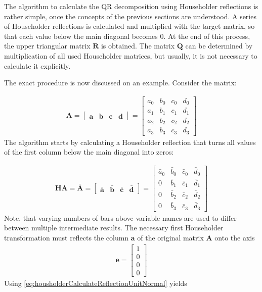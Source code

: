 The algorithm to calculate the QR decomposition using Householder reflections is rather simple, once the concepts of the previous sections are understood.
A series of Householder reflections is calculated and multiplied with the target matrix, so that each value below the main diagonal becomes 0.
At the end of this process, the upper triangular matrix $\mathbf{R}$ is obtained.
The matrix $\mathbf{Q}$ can be determined by multiplication of all used Householder matrices, but usually, it is not necessary to calculate it explicitly.

The exact procedure is now discussed on an example.
Consider the matrix:

\begin{align*}
\mathbf{A}
=
\begin{bmatrix}
\mathbf{a} & \mathbf{b} & \mathbf{c} & \mathbf{d}
\end{bmatrix}
=
\begin{bmatrix}
a_0&b_0&c_0&d_0\\
a_1&b_1&c_1&d_1\\
a_2&b_2&c_2&d_2\\
a_3&b_3&c_3&d_3
\end{bmatrix}
\end{align*}
%
The algorithm starts by calculating a Householder reflection that turns all values of the first column below the main diagonal into zeros:

\begin{align}
\mathbf{H}\mathbf{A} 
=
\mathbf{\bar{A}}
=
\begin{bmatrix}
\mathbf{\bar{a}} & \mathbf{\bar{b}} & \mathbf{\bar{c}} & \mathbf{\bar{d}}
\end{bmatrix}
=
\begin{bmatrix}
\bar{a}_0&\bar{b}_0&\bar{c}_0&\bar{d}_0\\
0        &\bar{b}_1&\bar{c}_1&\bar{d}_1\\
0        &\bar{b}_2&\bar{c}_2&\bar{d}_2\\
0        &\bar{b}_3&\bar{c}_3&\bar{d}_3
\end{bmatrix}					  
\end{align}
%
Note, that varying numbers of bars above variable names are used to differ between multiple intermediate results.
The necessary first Householder transformation must reflects the column $\mathbf{a}$ of the original matrix $\mathbf{A}$ onto the axis
\begin{align}
\mathbf{e}  
=
\begin{bmatrix}
1\\
0\\
0\\
0
\end{bmatrix}
\end{align}
%
Using \cref{eq:housholderCalculateReflectionUnitNormal} yields

